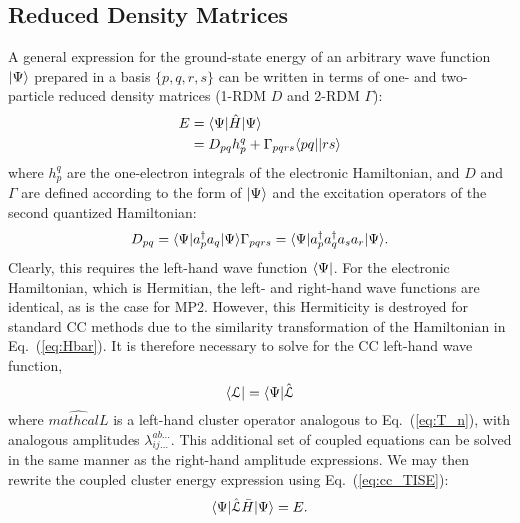 \subsection{Reduced Density Matrices} \label{ss:rdm} A general expression
for the ground-state energy of an arbitrary wave function $| \Psi \rangle$
prepared in a basis $\{p,q,r,s\}$ can be written in terms of one- and
two-particle reduced density matrices (1-RDM $D$ and 2-RDM $\Gamma$):
\cite{Harris1992,Trucks1988}
\begin{equation} \label{eq:pdm_e}
    \begin{aligned} E & = \langle\Psi |\hat{H}| \Psi \rangle \\
      & = D_{pq}h_{p}^{q} + \Gamma_{pqrs}\langle pq || rs \rangle
    \end{aligned}
\end{equation} where $h_{p}^{q}$ are the one-electron integrals of the
electronic Hamiltonian, and $D$ and $\Gamma$ are defined according to the
form of $| \Psi \rangle$ and the excitation operators of the second quantized
Hamiltonian: \begin{subequations} \begin{equation} \label{eq:opdm}
    D_{pq} = \bra{\Psi}a_p^{\dagger}a_q\ket{\Psi}
\end{equation} \begin{equation} \label{eq:tpdm}
    \Gamma_{pqrs} = \bra{\Psi}a_p^{\dagger}a_q^{\dagger}a_sa_r\ket{\Psi}.
\end{equation} \end{subequations} 
Clearly, this requires the
left-hand wave function $\langle\Psi |$. For the electronic Hamiltonian,
which is Hermitian, the left- and right-hand wave functions are identical,
as is the case for MP2. However, this Hermiticity is destroyed for standard
CC methods due to the similarity transformation of the Hamiltonian in
Eq.~(\ref{eq:Hbar}).\cite{Crawford2000} It is therefore necessary to solve for the CC left-hand
wave function, \begin{equation} \label{eq:cc_lwfn}
    \langle\mathcal{L} | = \langle\Psi |\hat{\mathcal{L}}
\end{equation} where $\hat{mathcal{L}}$ is a left-hand cluster
operator analogous to Eq.~(\ref{eq:T_n}), with analogous amplitudes
$\lambda_{ij\ldots}^{ab\ldots}$. This additional set of coupled
equations can be solved in the same manner as the right-hand amplitude
expressions. We may then rewrite the coupled cluster energy expression
using Eq.~(\ref{eq:cc_TISE}): \begin{equation} \label{eq:cc_energy_total}
    \langle\Psi |\hat{\mathcal{L}}\bar{H}| \Psi \rangle = E.
\end{equation}

